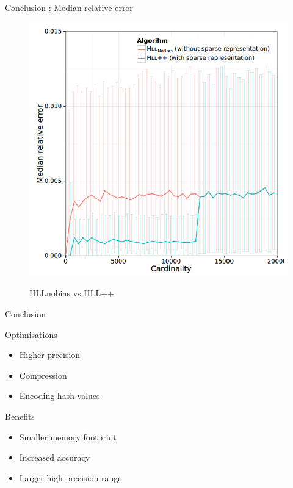 \documentclass{beamer}
\begin{document}
\begin{frame}{Conclusion : Median relative error}
\begin{figure}[c]
\includegraphics [scale=0.30]  {hll_fig5.png}

HLLnobias vs HLL++
\end{figure}
\end{frame}


\begin{frame}{Conclusion}

\begin{block}{Optimisations}
\begin{itemize}
\item Higher precision
\item Compression
\item Encoding hash values
\end{itemize}
\end{block}


\begin{block}{Benefits}
\begin{itemize}
\item Smaller memory footprint
\item Increased accuracy
\item Larger high precision range 
\end{itemize}
\end{block}

\end{frame}
\end{document}
